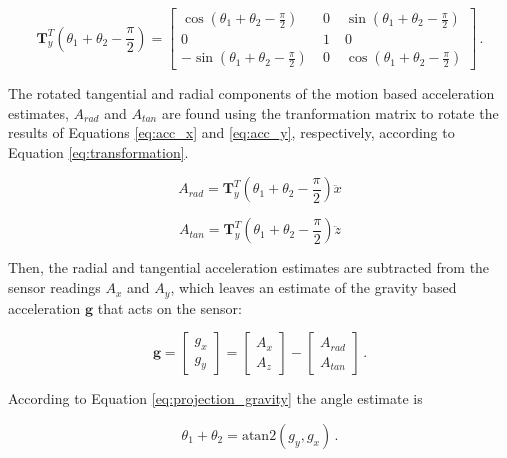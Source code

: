 \begin{equation}
\mathbf{T}^T_y(\theta_1 + \theta_2 - \frac{\pi}{2}) = \begin{bmatrix}
    \cos (\theta_1 + \theta_2 - \frac{\pi}{2}) \; & 0 \; & \sin (\theta_1 + \theta_2 - \frac{\pi}{2}) \\
    0 \; & 1 \; & 0 \\
    -\sin (\theta_1 + \theta_2 - \frac{\pi}{2}) \; & 0 \; & \cos (\theta_1 + \theta_2 - \frac{\pi}{2})
    \end{bmatrix}\,.
\end{equation}

\noindent
The rotated tangential and radial components of the motion based acceleration estimates, $A_{rad}$ and $A_{tan}$ are found using the tranformation matrix to rotate the results of Equations \ref{eq:acc_x} and \ref{eq:acc_y}, respectively, according to Equation \ref{eq:transformation}.

\begin{equation}
  A_{rad} = \mathbf{T}^T_y(\theta_1 + \theta_2 - \frac{\pi}{2}) \ddot{x}
\end{equation}

\begin{equation}
  A_{tan} = \mathbf{T}^T_y(\theta_1 + \theta_2 - \frac{\pi}{2}) \ddot{z}
\end{equation}

Then, the radial and tangential acceleration estimates are subtracted from the sensor readings $A_x$ and $A_y$, which leaves an estimate of the gravity based acceleration $\mathbf{g}$ that acts on the sensor:

\begin{equation}
\mathbf{g} = \begin{bmatrix}
    g_x \\
    g_y 
    \end{bmatrix} = 
    \begin{bmatrix}
    A_x \\
    A_z 
    \end{bmatrix} -
    \begin{bmatrix}
    A_{rad} \\
    A_{tan} 
    \end{bmatrix}\,.
\end{equation}

\noindent
According to Equation \ref{eq:projection_gravity} the angle estimate is

\begin{equation}
  \theta_1 + \theta_2 = \mbox{atan}2(g_y, g_x)\,.
\end{equation}

